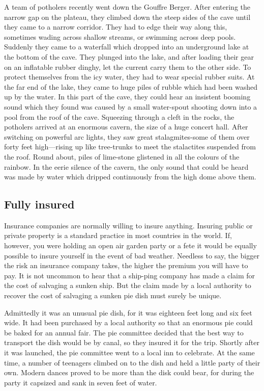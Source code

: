 \documentclass[11pt]{article}
\begin{document}
A team of potholers recently went down the Gouffre Berger. After entering the narrow gap on the plateau, they climbed down the steep sides of the cave until they came to a narrow corridor. They had to edge their way along this, sometimes wading across shallow streams, or swimming across deep pools. Suddenly they came to a waterfall which dropped into an underground lake at the bottom of the cave. They plunged into the lake, and after loading their gear on an inflatable rubber dinghy, let the current carry them to the other side. To protect themselves from the icy water, they had to wear special rubber suits. At the far end of the lake, they came to huge piles of rubble which had been washed up by the water. In this part of the cave, they could hear an insistent booming sound which they found was caused by a small water-spout shooting down into a pool from the roof of the cave. Squeezing through a cleft in the rocks, the potholers arrived at an enormous cavern, the size of a huge concert hall. After switching on powerful arc lights, they saw great stalagmites-some of them over forty feet high---rising up like tree-trunks to meet the stalactites suspended from the roof. Round about, piles of lime-stone glistened in all the colours of the rainbow. In the eerie silence of the cavern, the only sound that could be heard was made by water which dripped continuously from the high dome above them.
\subsection{Fully insured}
\label{sec-1-43}

Insurance companies are normally willing to insure anything. Insuring public or private property is a standard practice in most countries in the world. If, however, you were holding an open air garden party or a fete it would be equally possible to insure yourself in the event of bad weather. Needless to say, the bigger the risk an insurance company takes, the higher the premium you will have to pay. It is not uncommon to hear that a ship-ping company has made a claim for the cost of salvaging a sunken ship. But the claim made by a local authority to recover the cost of salvaging a sunken pie dish must surely be unique. 

Admittedly it was an unusual pie dish, for it was eighteen feet long and six feet wide. It had been purchased by a local authority so that an enormous pie could be baked for an annual fair. The pie committee decided that the best way to transport the dish would be by canal, so they insured it for the trip. Shortly after it was launched, the pie committee went to a local inn to celebrate. At the same time, a number of teenagers climbed on to the dish and held a little party of their own. Modern dances proved to be more than the disk could bear, for during the party it capsized and sank in seven feet of water. 
\end{document}

